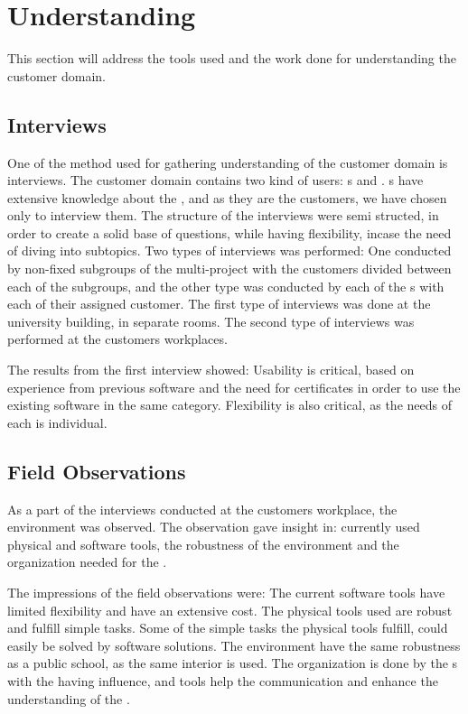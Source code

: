 \section{Understanding}
This section will address the tools used and the work done for understanding the customer domain.

\subsection{Interviews}
One of the method used for gathering understanding of the customer domain is interviews. 
The customer domain contains two kind of users: \guardian[c]s and \autists[].
\guardian[c]s have extensive knowledge about the \autists[], and as they are the customers, we have chosen only to interview them.
The structure of the interviews were semi structed, in order to create a solid base of questions, while having flexibility, incase the need of diving into subtopics. 
Two types of interviews was performed: One conducted by non-fixed subgroups of the multi-project with the customers divided between each of the subgroups, and the other type was conducted by each of the \localgroup{}s with each of their assigned customer. 
The first type of interviews was done at the university building, in separate rooms. 
The second type of interviews was performed at the customers workplaces. 

The results from the first interview showed: Usability is critical, based on experience from previous software and the need for certificates in order to use the existing software in the same category. Flexibility is also critical, as the needs of each \autist[] is individual.

\subsection{Field Observations}
As a part of the interviews conducted at the customers workplace, the environment was observed. The observation gave insight in: currently used physical and software tools, the robustness of the environment and the organization needed for the \austists[].

The impressions of the field observations were: The current software tools have limited flexibility and have an extensive cost. The physical tools used are robust and fulfill simple tasks. Some of the simple tasks the physical tools fulfill, could easily be solved by software solutions. The environment have the same robustness as a public school, as the same interior is used. The organization is done by the \guardian[]s with the \autists[] having influence, and tools help the communication and enhance the understanding of the \austits[].

